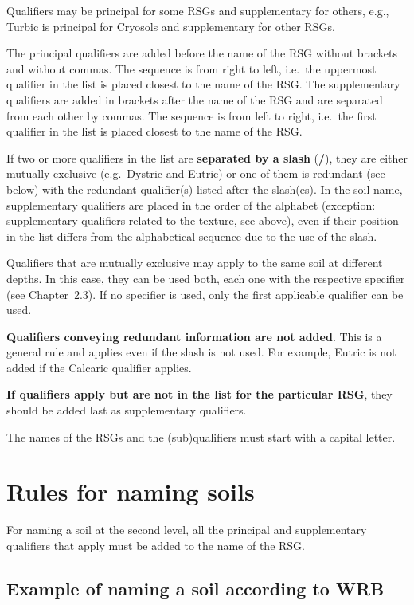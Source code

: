 \documentclass[
  letterpaper,
  DIV=11,
  numbers=noendperiod]{scrreprt}
\begin{document}
Qualifiers may be principal for some RSGs and supplementary for others,
e.g., Turbic is principal for Cryosols and supplementary for other RSGs.

The principal qualifiers are added before the name of the RSG without
brackets and without commas. The sequence is from right to left,
i.e.~the uppermost qualifier in the list is placed closest to the name
of the RSG. The supplementary qualifiers are added in brackets after the
name of the RSG and are separated from each other by commas. The
sequence is from left to right, i.e.~the first qualifier in the list is
placed closest to the name of the RSG.

If two or more qualifiers in the list are \textbf{separated by a slash}
(\textbf{/}), they are either mutually exclusive (e.g.~Dystric and
Eutric) or one of them is redundant (see below) with the redundant
qualifier(s) listed after the slash(es). In the soil name, supplementary
qualifiers are placed in the order of the alphabet (exception:
supplementary qualifiers related to the texture, see above), even if
their position in the list differs from the alphabetical sequence due to
the use of the slash.

Qualifiers that are mutually exclusive may apply to the same soil at
different depths. In this case, they can be used both, each one with the
respective specifier (see Chapter~2.3). If no specifier is used, only
the first applicable qualifier can be used.

\textbf{Qualifiers conveying redundant information are not added}. This
is a general rule and applies even if the slash is not used. For
example, Eutric is not added if the Calcaric qualifier applies.

\textbf{If qualifiers apply but are not in the list for the particular
RSG}, they should be added last as supplementary qualifiers.

The names of the RSGs and the (sub)qualifiers must start with a capital
letter.

\hypertarget{rules-for-naming-soils}{%
\section{Rules for naming soils}\label{rules-for-naming-soils}}

For naming a soil at the second level, all the principal and
supplementary qualifiers that apply must be added to the name of the
RSG.

\hypertarget{example-of-naming-a-soil-according-to-wrb}{%
\subsection{Example of naming a soil according to
WRB}\label{example-of-naming-a-soil-according-to-wrb}}
\end{document}
